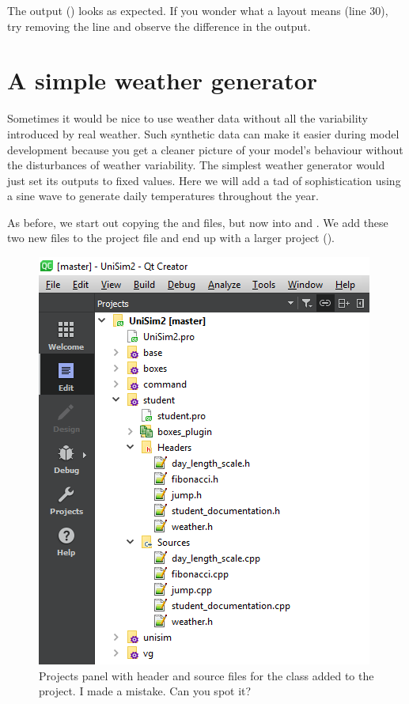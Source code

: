 The output () looks as expected. If you wonder what a  layout means (line 30), try removing the line and observe the difference in the output.

\section {A simple weather generator}

Sometimes it would be nice to use weather data without all the variability introduced by real weather. Such synthetic data can make it easier during model development because you get a cleaner picture of your model's behaviour without the disturbances of weather variability. The simplest weather generator would just set its outputs to fixed values. Here we will add a tad of sophistication using a sine wave to generate daily temperatures throughout the year.

As before, we start out copying the  and  files, but now into  and . We add these two new files to the  project file and end up with a larger project ().

\begin{figure}
\centering
\includegraphics[scale=0.7]{graphics/qt-creator-projects-student-3}
\caption{Projects panel with header and source files for the  class added to the  project. I made a mistake. Can you spot it?}
\label{fig:qt-creator-projects-student-3}
\end{figure}

